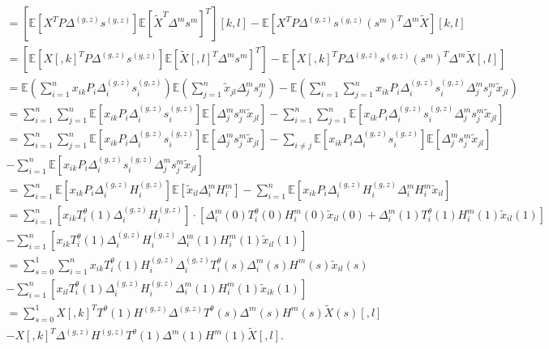 \documentclass[12pt]{article}
\begin{document}
\begin{appendices}
\begin{refsection}
\begin{multline}
		= \left[ \mathbb{E} \left[ {X}^T P \Delta^{(g,z)} s^{(g,z)} \right] \mathbb{E}\left[\tilde{X}^T \Delta^m s^m\right]^T\right][k,l] - \mathbb{E} \left[{X}^T P \Delta^{(g,z)} s^{(g,z)} (s^m)^T \Delta^m \tilde{X} \right][k,l] \\ = \left[\mathbb{E}\left[{X}[,k]^T P \Delta^{(g,z)} s^{(g,z)}\right]\mathbb{E}\left[\tilde{X}[,l]^T \Delta^m s^m\right]^T\right] - \mathbb{E} \left[{X}[,k]^T P \Delta^{(g,z)} s^{(g,z)} (s^m)^T \Delta^m \tilde{X}[,l] \right] \\ = \mathbb{E}\left(\sum_{i=1}^n x_{ik} P_i \Delta^{(g,z)}_i s^{(g,z)}_i\right) \mathbb{E} \left(\sum_{j=1}^n \tilde{x}_{jl} \Delta^m_j s^m_j \right) - \mathbb{E} \left(\sum_{i=1}^n \sum_{j=1}^n x_{ik} P_i \Delta^{(g,z)}_i s^{(g,z)}_i \Delta^m_j s^m_j \tilde{x}_{jl}  \right) \\ 
		= \sum_{i=1}^n \sum_{j=1}^n \mathbb{E} [x_{ik} P_i \Delta^{(g,z)}_i s^{(g,z)}_i] \mathbb{E}[\Delta^m_js^m_j \tilde{x}_{jl}] - \sum_{i=1}^n \sum_{j=1}^n \mathbb{E}[x_{ik} P_i \Delta^{(g,z)}_i s^{(g,z)}_i \Delta^m_j s^m_j \tilde{x}_{jl}] \\
		= \sum_{i=1}^n \sum_{j=1}^n \mathbb{E} [x_{ik} P_i \Delta^{(g,z)}_i s^{(g,z)}_i ] \mathbb{E}[\Delta^m_js^m_j \tilde{x}_{jl}] - \sum_{i \neq j} \mathbb{E} [x_{ik} P_i \Delta^{(g,z)}_i s^{(g,z)}_i] \mathbb{E}[\Delta^m_js^m_j \tilde{x}_{jl}] \\ - \sum_{i=1}^n \mathbb{E}[x_{ik} P_i \Delta^{(g,z)}_i s^{(g,z)}_i \Delta^m_j s^m_j \tilde{x}_{jl}] \\
		= \sum_{i=1}^n \mathbb{E}[x_{ik} P_i \Delta_i^{(g,z)} H^{(g,z)}_i] \mathbb{E}[\tilde{x}_{il} \Delta^m_i H^m_i] - \sum_{i=1}^n \mathbb{E}[x_{ik} P_i \Delta_i^{(g,z)} H_i^{(g,z)} \Delta_i^m H_i^m \tilde{x}_{il}] \\ 
		= \sum_{i=1}^n \left[x_{ik} T_i^\theta(1) \Delta^{(g,z)}_i H^{(g,z)}_i \right] \cdot \left[{\Delta}^m_i(0) T^\theta_i(0) {H}^m_i(0) \tilde{x}_{il}(0) + {\Delta}^m_i(1) T_i^\theta(1) {H}^m_i(1) \tilde{x}_{il}(1)\right]
		\\ - \sum_{i=1}^n \left[x_{ik} T_i^\theta(1) \Delta^{(g,z)}_i H^{(g,z)}_i \Delta^m_i(1) H^m_i(1) \tilde{x}_{il}(1)\right] 
		\\ = \sum_{s=0}^1 \sum_{i=1}^n x_{ik} T_i^\theta(1) H_i^{(g,z)} \Delta_i^{(g,z)} T^\theta_i(s) \Delta_i^m(s) H^m(s) \tilde{x}_{il}(s) \\ - \sum_{i=1}^n \left[x_{il}T_i^\theta(1) \Delta^{(g,z)}_i H^{(g,z)}_i \Delta^m_i(1) H^m_i(1) \tilde{x}_{ik}(1)\right] \\ = \sum_{s=0}^1 X[,k]^T T^\theta(1) H^{(g,z)} \Delta^{(g,z)} T^\theta(s)\Delta^m(s)H^m(s) \tilde{X}(s)[,l] \\ - X[,k]^T \Delta^{(g,z)} H^{(g,z)} T^\theta(1)\Delta^m(1) H^m(1) \tilde{X}[,l].

\end{multline}
\end{refsection}
\end{appendices}
\end{document}
